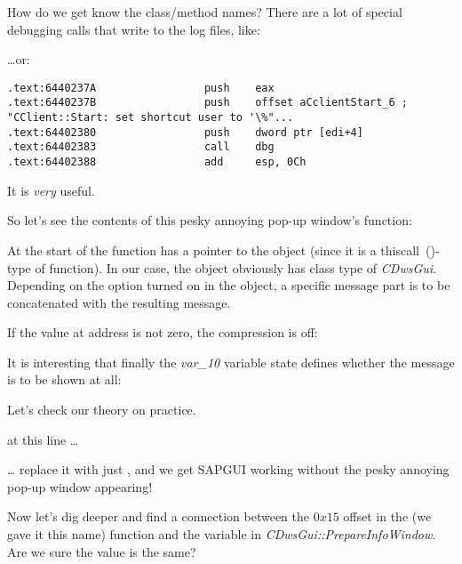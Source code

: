 How do we get know the class/method names? There are a lot of special debugging calls that write to the log files, like:



\dots or:

\begin{lstlisting}[style=customasmx86]
.text:6440237A                 push    eax
.text:6440237B                 push    offset aCclientStart_6 ; "CClient::Start: set shortcut user to '\%"...
.text:64402380                 push    dword ptr [edi+4]
.text:64402383                 call    dbg
.text:64402388                 add     esp, 0Ch
\end{lstlisting}

It is \emph{very} useful.

So let's see the contents of this pesky annoying pop-up window's function:



At the start of the function \ECX has a pointer to the object (since it is a thiscall~()-type of function).
In our case, the object obviously has class type of \emph{CDwsGui}. 
Depending on the option turned on in the object, a specific message part is to be concatenated with the resulting message.

If the value at address  is not zero, the compression is off:



It is interesting that finally the \emph{var\_10} variable state defines whether the message is to be shown at all:



Let's check our theory on practice.

\JNZ at this line \dots



\dots 
replace it with just \JMP, and we get SAPGUI working without the pesky annoying pop-up window appearing!

Now let's dig deeper and find a connection between the $0x15$ offset in the  
(we gave it this name) function and the  variable in \emph{CDwsGui::PrepareInfoWindow}. 
Are we sure the value is the same?

